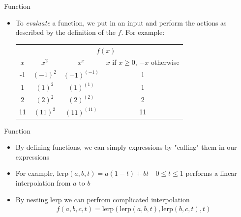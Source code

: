 \documentclass[10pt,xcolor={table,dvipsnames},t]{beamer}
\begin{document}
\begin{frame}{Function}
  \begin{itemize}
    \item To \textit{evaluate} a function, we put in an input and perform the actions as described by the definition of the $f$. For example:
    \begin{table}[]
      \begin{tabular}{cccc}
                               & \multicolumn{3}{c}{$f(x)$}                                                                            \\ \cline{2-4} 
      \multicolumn{1}{c|}{$x$} & \multicolumn{1}{c|}{$x^2$}    & \multicolumn{1}{c|}{$x^x$}         & $x$ if $x\geq 0$, $-x$ otherwise \\ \hline
      \multicolumn{1}{c|}{-1}  & \multicolumn{1}{c|}{$(-1)^2$} & \multicolumn{1}{c|}{$(-1)^{(-1)}$} & 1                                \\ \cline{1-1}
      \multicolumn{1}{c|}{1}   & \multicolumn{1}{c|}{$(1)^2$}  & \multicolumn{1}{c|}{$(1)^{(1)}$}   & 1                                \\ \cline{1-1}
      \multicolumn{1}{c|}{2}   & \multicolumn{1}{c|}{$(2)^2$}  & \multicolumn{1}{c|}{$(2)^{(2)}$}   & 2                                \\ \cline{1-1}
      \multicolumn{1}{c|}{11}  & \multicolumn{1}{c|}{$(11)^2$} & \multicolumn{1}{c|}{$(11)^{(11)}$} & 11                              
      \end{tabular}
      \end{table}
  \end{itemize}
\end{frame}

\begin{frame}{Function}
  \begin{itemize}
    \item By defining functions, we can simply expressions by "calling" them in our expressions 
    \item For example, $\text{lerp}(a,b,t) = a(1-t) + bt \quad 0\leq t \leq 1$ performs a linear interpolation from $a$ to $b$
    \item By nesting $\text{lerp}$ we can perfrom complicated interpolation
    \begin{align*}
      f(a,b,c,t) = \text{lerp}(\text{lerp}(a,b,t),\text{lerp}(b,c,t),t) 
    \end{align*}
  \end{itemize}
\end{frame}
\end{document}
